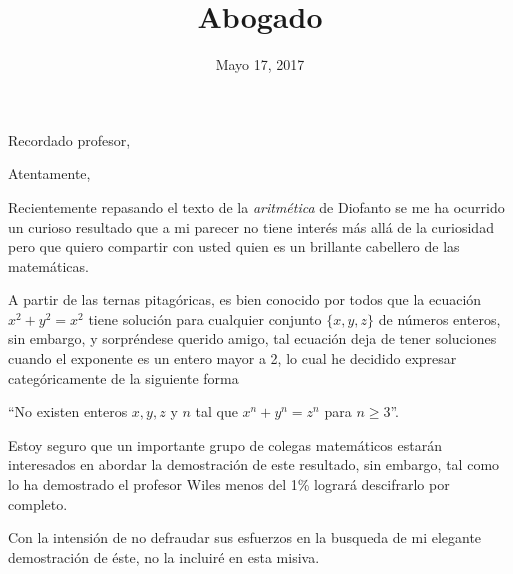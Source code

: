 \documentclass[11pt,a4paper,sans]{moderncv}        %
\title{Abogado}                               %
\begin{document}
\date{Mayo 17, 2017}
\opening{Recordado profesor,}
\closing{Atentamente,}
\makelettertitle

Recientemente repasando el texto de la \emph{aritmética} de Diofanto se me ha ocurrido un curioso resultado que a mi parecer no tiene interés más allá de la curiosidad pero que quiero compartir con usted quien es un brillante cabellero de las matemáticas.

A partir de las ternas pitagóricas, es bien conocido por todos que la ecuación $x^2 + y^2 = x^2$ tiene solución para cualquier conjunto $\{x, y, z\}$ de números enteros, sin embargo, y sorpréndese querido amigo, tal ecuación deja de tener soluciones cuando el exponente es un entero mayor a 2, lo cual he decidido expresar categóricamente de la siguiente forma

\begin{center}
	``No existen enteros $x, y, z$ y $n$ tal que $x^n + y^n = z^n$ para $n \geq 3$''.
\end{center}

Estoy seguro que un importante grupo de colegas matemáticos estarán interesados en abordar la demostración de este resultado, sin embargo, tal como lo ha demostrado el profesor Wiles menos del 1\% logrará descifrarlo por completo.

Con la intensión de no defraudar sus esfuerzos en la busqueda de mi elegante demostración de éste, no la incluiré en esta misiva.

\makeletterclosing
\end{document}
